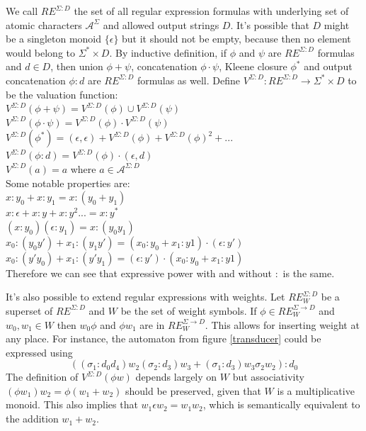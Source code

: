 We call  $RE^{\Sigma:D}$ the set of all regular expression formulas with underlying set of atomic characters $\mathcal{A}^\Sigma$ and allowed output strings $D$. It's possible that $D$ might be a singleton monoid $\{\epsilon \}$ but it should not be empty, because then no element would belong to $\Sigma^* \times D$. By inductive definition, if $\phi$ and $\psi$  are $RE^{ \Sigma:D}$  formulas and $d \in D$, then union $\phi + \psi$, concatenation $\phi \cdot \psi$, Kleene closure $\phi^*$ and output concatenation $\phi : d$ are $RE^{ \Sigma:D}$ formulas as well.  Define $V^{\Sigma:D}:RE^{\Sigma:D} \rightarrow \Sigma^* \times D$ to be the valuation function:  \\
$V^{\Sigma:D}(\phi + \psi) = V^{\Sigma:D}(\phi) \cup V^{\Sigma:D}(\psi)$ \\
$V^{\Sigma:D}(\phi \cdot \psi) = V^{\Sigma:D}(\phi) \cdot  V^{\Sigma:D}(\psi)$ \\
$V^{\Sigma:D}(\phi^*) = (\epsilon,\epsilon) + V^{\Sigma:D}(\phi) + V^{\Sigma:D}(\phi)^2 + ...$ \\
$V^{\Sigma:D}(\phi : d) = V^{\Sigma:D}(\phi)  \cdot (\epsilon,d)$ \\
$V^{\Sigma:D}(a) = a$ where $a\in\mathcal{A}^{\Sigma:D}$ \\
Some notable properties are: \\
$x:y_0 +x:y_1 = x:(y_0+y_1)$ \\
$x:\epsilon+x:y+x:y^2...=x:y^*$ \\
$(x:y_0)(\epsilon:y_1)  = x:(y_0y_1)$\\
$x_0:(y_0y')+x_1:(y_1y') = (x_0:y_0+x_1:y1)\cdot(\epsilon:y')$ \\
$x_0:(y'y_0)+x_1:(y'y_1) = (\epsilon:y')\cdot(x_0:y_0+x_1:y1)$  \\
Therefore we can see that expressive power with and without $:$ is the same. 

It's also possible to extend regular expressions with weights. Let $RE_W^{\Sigma: D}$ be a superset of $RE^{\Sigma: D}$ and $W$ be the set of weight symbols. If $\phi\in RE_W^{\Sigma\rightarrow D}$ and $w_0,w_1\in W$ then $w_0 \phi $ and  $\phi w_1 $ are in $RE_W^{\Sigma\rightarrow D}$. This allows for inserting weight at any place. For instance, the automaton from figure \ref{transducer} could be expressed using \[
((\sigma_1:d_0d_4)w_2(\sigma_2:d_3)w_3+
(\sigma_1:d_3)w_3\sigma_2w_2):d_0
\]
The definition of $V^{\Sigma:D}(\phi w)$ depends largely on $W$ but associativity $(\phi w_1) w_2 = \phi (w_1 + w_2)$ should be preserved, given that $W$ is a multiplicative monoid. This also implies that $w_1 \epsilon w_2 = w_1 w_2$, which is semantically equivalent to the addition $w_1 + w_2$. 

